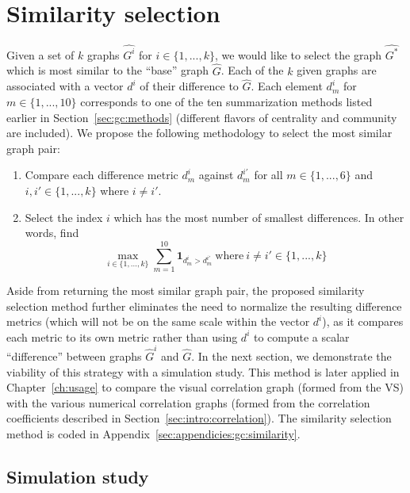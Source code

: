 \section{Similarity selection}
\label{sec:gc:simulations}

Given a set of $k$ graphs $\hat{G^i}$ for $i \in \{1,...,k\}$, we would like to 
select the graph $\hat{G^*}$ which is most similar to the ``base'' graph 
$\hat{G}$. Each of the $k$ given graphs are associated with a vector 
$d^{i}$ of their difference to $\hat{G}$. Each element $d^{i}_m$ for $m \in 
\{1,...,10\}$ corresponds to one of the ten summarization methods listed 
earlier in Section~\ref{sec:gc:methods} (different flavors of 
centrality and community are included). 
We propose the following methodology to select the most similar graph pair:

\tablespacing
\begin{enumerate}
	\item Compare each difference metric $d^{i}_m$ against 
	$d^{i'}_m$ for all $m \in \{1,...,6\}$ and $i,i' \in 
	\{1,...,k\}$ where $i \neq i'$. 
	\item Select the index $i$ which has the most number of smallest 
	differences. In other words, find
	$$\max\limits_{i \in \{1,...,k\}} 
	\sum\limits^{10}_{m=1} \textbf{1}_{d^{i}_m > d^{i'}_m} \ \text{where} \ i 
	\neq i' \in \{1,...,k\}$$
\end{enumerate}
\bodyspacing

Aside from returning the most similar graph pair, the proposed similarity 
selection method further eliminates the need to normalize the resulting 
difference metrics (which will not be on the same scale within the vector
$d^i$), as it compares each metric to its own metric rather 
than using $d^i$ to compute a scalar ``difference'' between graphs 
$\hat{G}^i$ and $\hat{G}$. In the next section, we demonstrate the viability of 
this strategy with a simulation study. This method is later applied in 
Chapter~\ref{ch:usage} to compare the visual correlation graph (formed from the 
VS) with the various numerical correlation graphs (formed from the correlation 
coefficients described in Section~\ref{sec:intro:correlation}).
The similarity selection method is coded in 
Appendix~\ref{sec:appendicies:gc:similarity}.

\subsection{Simulation study}
\label{sec:gc:simulations:algorithm}

